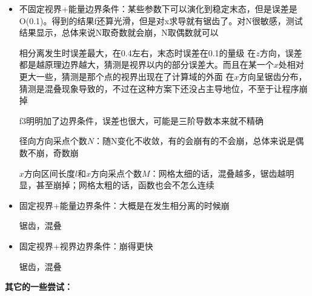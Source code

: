 \documentclass[12pt,a4paper]{ctexart}
\numberwithin{equation}{section}
\begin{document}
\begin{itemize}
    \item 不固定视界+能量边界条件：某些参数下可以演化到稳定末态，但是误差是O(0.1)。得到的结果f还算光滑，但是对x求导就有锯齿了。对N很敏感，测试结果显示，总体来说N取奇数就会崩，N取偶数就可以
    
    相分离发生时误差最大，在0.4左右，末态时误差在0.1的量级
    在$z$方向，误差都是越原理边界越大，猜测是视界以内的部分误差大。而且在某一个$x$处相对更大一些，猜测是那个点的视界出现在了计算域的外面
    在$x$方向呈锯齿分布，猜测是混叠现象导致的，不过在这种方案下还没占主导地位，不至于让程序崩掉
    
    f3明明加了边界条件，误差也很大，可能是三阶导数本来就不精确

    径向方向采点个数$N$：随N变化不收敛，有的会崩有的不会崩，总体来说是偶数不崩，奇数崩

    $x$方向区间长度$l$和$x$方向采点个数$M$：网格太细的话，混叠越多，锯齿越明显，甚至崩掉；网格太粗的话，函数也会不怎么连续
    \item 固定视界+能量边界条件：大概是在发生相分离的时候崩
    
    锯齿，混叠
    \item 固定视界+视界边界条件：崩得更快
    
    锯齿，混叠
\end{itemize}

\textbf{其它的一些尝试：}
\end{document}

